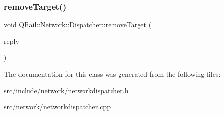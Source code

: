 \subsubsection{\texorpdfstring{removeTarget()}{removeTarget()}}
{\footnotesize\ttfamily void Q\+Rail\+::\+Network\+::\+Dispatcher\+::remove\+Target (\begin{DoxyParamCaption}\item[{Q\+Network\+Reply $\ast$}]{reply }\end{DoxyParamCaption})}



The documentation for this class was generated from the following files\+:\begin{DoxyCompactItemize}
\item 
src/include/network/\mbox{\hyperlink{networkdispatcher_8h}{networkdispatcher.\+h}}\item 
src/network/\mbox{\hyperlink{networkdispatcher_8cpp}{networkdispatcher.\+cpp}}\end{DoxyCompactItemize}
